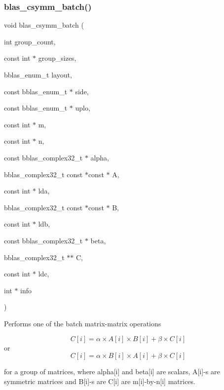 \subsubsection{\texorpdfstring{blas\+\_\+csymm\+\_\+batch()}{blas\_csymm\_batch()}}
{\footnotesize\ttfamily void blas\+\_\+csymm\+\_\+batch (\begin{DoxyParamCaption}\item[{int}]{group\+\_\+count,  }\item[{const int $\ast$}]{group\+\_\+sizes,  }\item[{bblas\+\_\+enum\+\_\+t}]{layout,  }\item[{const bblas\+\_\+enum\+\_\+t $\ast$}]{side,  }\item[{const bblas\+\_\+enum\+\_\+t $\ast$}]{uplo,  }\item[{const int $\ast$}]{m,  }\item[{const int $\ast$}]{n,  }\item[{const bblas\+\_\+complex32\+\_\+t $\ast$}]{alpha,  }\item[{bblas\+\_\+complex32\+\_\+t const $\ast$const $\ast$}]{A,  }\item[{const int $\ast$}]{lda,  }\item[{bblas\+\_\+complex32\+\_\+t const $\ast$const $\ast$}]{B,  }\item[{const int $\ast$}]{ldb,  }\item[{const bblas\+\_\+complex32\+\_\+t $\ast$}]{beta,  }\item[{bblas\+\_\+complex32\+\_\+t $\ast$$\ast$}]{C,  }\item[{const int $\ast$}]{ldc,  }\item[{int $\ast$}]{info }\end{DoxyParamCaption})}

Performs one of the batch matrix-\/matrix operations

\[ C[i] = \alpha \times A[i] \times B[i] + \beta \times C[i] \] or \[ C[i] = \alpha \times B[i] \times A[i] + \beta \times C[i] \]

for a group of matrices, where alpha\mbox{[}i\mbox{]} and beta\mbox{[}i\mbox{]} are scalars, A\mbox{[}i\mbox{]}-\/s are symmetric matrices and B\mbox{[}i\mbox{]}-\/s are C\mbox{[}i\mbox{]} are m\mbox{[}i\mbox{]}-\/by-\/n\mbox{[}i\mbox{]} matrices.



